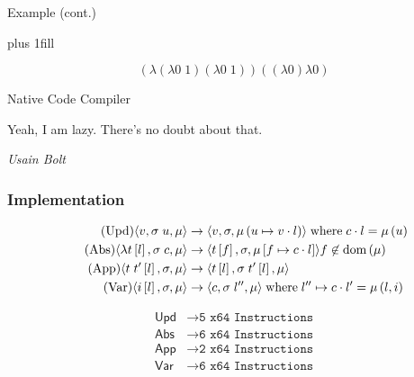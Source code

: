 \documentclass[14pt]{beamer}
\newcommand{\sectionslide}[3]{
  \begin{frame}
  \vspace{1cm}
  \vfill
  {\usebeamerfont{title} \color{red} #1}
  \vfill
  \epigraph{\footnotesize{#2}}{\footnotesize{\emph{#3}}}
  \end{frame}}
\begin{document}
\begin{frame}{Example (cont.)}
\begin{center}
\vskip0pt plus 1fill
\end{center}
$$(\lambda (\lambda 0 \; 1) (\lambda 0 \; 1))((\lambda 0) \lambda 0)$$
\end{frame}

\sectionslide{Native Code Compiler}
{Yeah, I am lazy. There's no doubt about that.}
{Usain Bolt}

\begin{frame}
\frametitle{Implementation}
\footnotesize
\begin{align*}
\tag{Upd}
\langle v,  \sigma \; u , \mu \rangle 
  &\rightarrow
\langle v, \sigma, \mu\left(u \mapsto v \cdot l\right) \rangle  
\; \textnormal{where} \; c \cdot l = \mu\left(u\right) \\
\tag{Abs}
\langle \lambda t\left[l\right], \sigma \; c, \mu \rangle 
  &\rightarrow
\langle t\left[f\right], \sigma, \mu\left[f \mapsto c \cdot l\right]\rangle f
\not \in \textnormal{dom}\left(\mu\right)  \\
\tag{App}
\langle t \; t'\left[l\right], \sigma, \mu \rangle
  &\rightarrow
\langle t\left[l\right], \sigma \; t'\left[l\right], \mu \rangle \\
\tag{Var}
\langle i\left[l\right], \sigma, \mu \rangle
  &\rightarrow
\langle c, \sigma \; l'', \mu \rangle
\; \textnormal{where} \; l'' \mapsto c \cdot l' = \mu\left(l, i\right)
\end{align*}

\begin{align*}
\textsf{Upd} &\rightarrow \texttt{5 x64 Instructions} \\
\textsf{Abs} &\rightarrow \texttt{6 x64 Instructions} \\
\textsf{App} &\rightarrow \texttt{2 x64 Instructions} \\
\textsf{Var} &\rightarrow \texttt{6 x64 Instructions} \\
\end{align*}
\end{frame}
\end{document}
